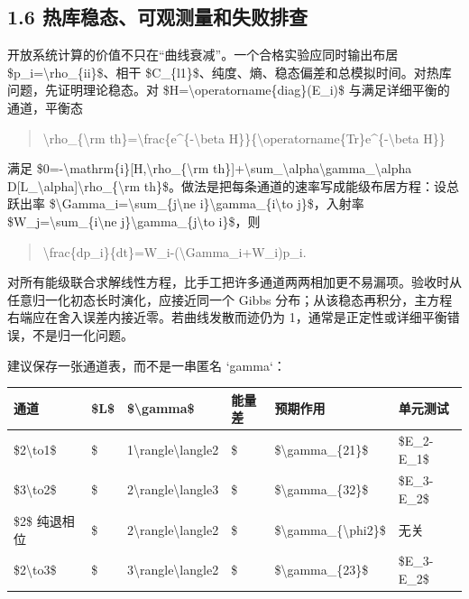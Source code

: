 \documentclass[UTF8,openany,11pt,fontset=fandol]{ctexbook}
\begin{document}
\subsection{\texorpdfstring{\textbf{1.6
热库稳态、可观测量和失败排查}}{1.6 热库稳态、可观测量和失败排查}}\label{ux70edux5e93ux7a33ux6001ux53efux89c2ux6d4bux91cfux548cux5931ux8d25ux6392ux67e5}

开放系统计算的价值不只在``曲线衰减''。一个合格实验应同时输出布居
\$p\_i=\textbackslash rho\_\{ii\}\$、相干
\$C\_\{l1\}\$、纯度、熵、稳态偏差和总模拟时间。对热库问题，先证明理论稳态。对
\$H=\textbackslash operatorname\{diag\}(E\_i)\$
与满足详细平衡的通道，平衡态

\begin{quote}
\textbackslash rho\_\{\textbackslash rm
th\}=\textbackslash frac\{e\^{}\{-\textbackslash beta
H\}\}\{\textbackslash operatorname\{Tr\}e\^{}\{-\textbackslash beta
H\}\}
\end{quote}

满足
\$0=-\textbackslash mathrm\{i\}{[}H,\textbackslash rho\_\{\textbackslash rm
th\}{]}+\textbackslash sum\_\textbackslash alpha\textbackslash gamma\_\textbackslash alpha
D{[}L\_\textbackslash alpha{]}\textbackslash rho\_\{\textbackslash rm
th\}\$。做法是把每条通道的速率写成能级布居方程：设总跃出率
\$\textbackslash Gamma\_i=\textbackslash sum\_\{j\textbackslash ne
i\}\textbackslash gamma\_\{i\textbackslash to j\}\$，入射率
\$W\_j=\textbackslash sum\_\{i\textbackslash ne
j\}\textbackslash gamma\_\{j\textbackslash to i\}\$，则

\begin{quote}
\textbackslash frac\{dp\_i\}\{dt\}=W\_i-(\textbackslash Gamma\_i+W\_i)p\_i.
\end{quote}

对所有能级联合求解线性方程，比手工把许多通道两两相加更不易漏项。验收时从任意归一化初态长时演化，应接近同一个
Gibbs
分布；从该稳态再积分，主方程右端应在舍入误差内接近零。若曲线发散而迹仍为
1，通常是正定性或详细平衡错误，不是归一化问题。

建议保存一张通道表，而不是一串匿名 `gamma`：

\begin{longtable}[]{@{}llllll@{}}
\toprule
\textbf{通道} & \textbf{\$L\$} & \textbf{\$\textbackslash gamma\$} &
\textbf{能量差} & \textbf{预期作用} & \textbf{单元测试}\tabularnewline
\midrule
\endhead
\$2\textbackslash to1\$ & \$ &
1\textbackslash rangle\textbackslash langle2 & \$ &
\$\textbackslash gamma\_\{21\}\$ & \$E\_2-E\_1\$\tabularnewline
\$3\textbackslash to2\$ & \$ &
2\textbackslash rangle\textbackslash langle3 & \$ &
\$\textbackslash gamma\_\{32\}\$ & \$E\_3-E\_2\$\tabularnewline
\$2\$ 纯退相位 & \$ & 2\textbackslash rangle\textbackslash langle2 & \$
& \$\textbackslash gamma\_\{\textbackslash phi2\}\$ &
无关\tabularnewline
\$2\textbackslash to3\$ & \$ &
3\textbackslash rangle\textbackslash langle2 & \$ &
\$\textbackslash gamma\_\{23\}\$ & \$E\_3-E\_2\$\tabularnewline
\bottomrule
\end{longtable}
\end{document}
